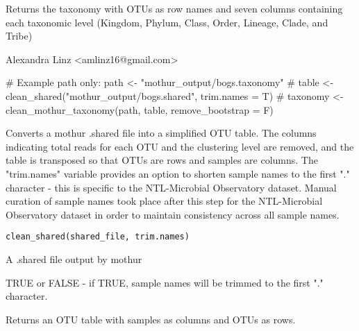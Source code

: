 \documentclass[a4paper]{book}
\begin{document}
%
\begin{Value}
Returns the taxonomy with OTUs as row names and seven columns containing each taxonomic level (Kingdom, Phylum, Class, Order, Lineage, Clade, and Tribe)
\end{Value}
%
\begin{Author}\relax
Alexandra Linz <amlinz16@gmail.com>
\end{Author}
%
\begin{Examples}
\begin{ExampleCode}

# Example path only: path <- "mothur_output/bogs.taxonomy"
# table <- clean_shared("mothur_output/bogs.shared", trim.names = T)
# taxonomy <- clean_mothur_taxonomy(path, table, remove_bootstrap = F)

\end{ExampleCode}
\end{Examples}
%
\begin{Description}\relax
Converts a mothur .shared file into a simplified OTU table. The columns indicating total reads for each OTU and the clustering level are removed, and the table is transposed so that OTUs are rows and samples are columns. The "trim.names" variable provides an option to shorten sample names to the first "." character - this is specific to the NTL-Microbial Observatory dataset. Manual curation of sample names took place after this step for the NTL-Microbial Observatory dataset in order to maintain consistency across all sample names.
\end{Description}
%
\begin{Usage}
\begin{verbatim}
clean_shared(shared_file, trim.names)
\end{verbatim}
\end{Usage}
%
\begin{Arguments}
\begin{ldescription}
\item[\code{shared\_file}] 
A .shared file output by mothur

\item[\code{trim.names}] 
TRUE or FALSE - if TRUE, sample names will be trimmed to the first "." character.

\end{ldescription}
\end{Arguments}
%
\begin{Value}
Returns an OTU table with samples as columns and OTUs as rows. 
\end{Value}
\end{document}

